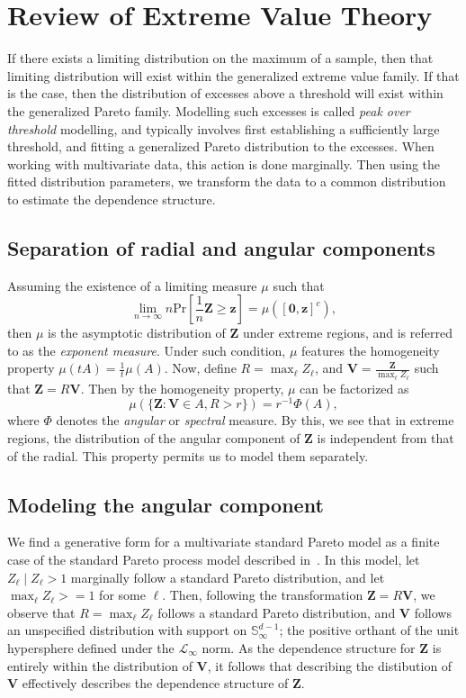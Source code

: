 \section{Review of Extreme Value Theory}

If there exists a limiting distribution on the maximum of a sample, then that limiting 
    distribution will exist within the generalized extreme value family.  If that is the 
    case, then the distribution of excesses above a threshold will exist within the 
    generalized Pareto family.  Modelling such excesses is called \emph{peak over threshold}
    modelling, and typically involves first establishing a sufficiently large threshold, 
    and fitting a generalized Pareto distribution to the excesses.  When working with multivariate
    data, this action is done marginally.  Then using the fitted distribution parameters,
    we transform the data to a common distribution to estimate the dependence structure.

\subsection{Separation of radial and angular components}
Assuming the existence of a limiting measure $\mu$ such that
\[
    \lim_{n\to\infty} n\text{Pr}\left[\frac{1}{n}\bm{Z} \geq \bm{z}\right] = \mu\left([\bm{0},\bm{z}]^c\right),
\]
then $\mu$ is the asymptotic distribution of $\bm{Z}$ under extreme regions, and is referred to as the 
    \emph{exponent measure}.  Under such condition, $\mu$ features the homogeneity property 
    $\mu(tA) = \frac{1}{t}\mu(A)$.  Now, define $R = \max_{\ell} Z_{\ell}$, and 
    $\bm{V} = \frac{\bm{Z}}{\max_{\ell}Z_{\ell}}$ such that $\bm{Z} = R\bm{V}$.  Then by the homogeneity 
    property, $\mu$ can be factorized as
    \[
        \mu\left(\{\bm{Z} : \bm{V} \in A, R > r\}\right) = r^{-1}\Phi(A),    
    \]
    where $\Phi$ denotes the \emph{angular} or \emph{spectral} measure.  By this, we see that in extreme 
    regions, the distribution of the angular component of $\bm{Z}$ is independent from that of the radial.  
    This property permits us to model them separately.

\subsection{Modeling the angular component}
We find a generative form for a multivariate standard Pareto model as a finite case of the 
    standard Pareto process model described in~\cite{ferreria2014}.  In this model, let 
    $Z_{\ell}\mid Z_{\ell} > 1$ marginally follow a standard Pareto distribution, and let 
    $\max_{\ell}Z_{\ell} >= 1$ for some $\ell$.  Then, following the transformation 
    $\bm{Z} = R\bm{V}$, we observe that $R = \max_{\ell}Z_{\ell}$ follows a standard
    Pareto distribution, and $\bm{V}$ follows an unspecified distribution with support on 
    ${\mathbb S}_{\infty}^{d-1}$; the positive orthant of the unit hypersphere defined under the 
    $\mathcal{L}_{\infty}$ norm.  As the dependence structure for $\bm{Z}$ is entirely
    within the distribution of $\bm{V}$, it follows that describing the distibution of $\bm{V}$ 
    effectively describes the dependence structure of $\bm{Z}$.

